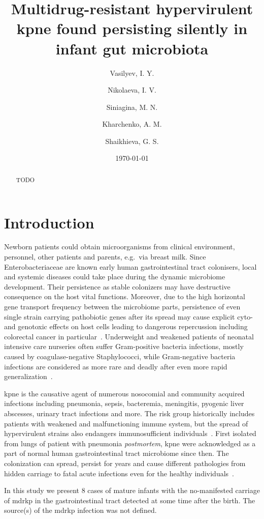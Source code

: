 \documentclass[12pt,a4paper]{article}
\author[1]{Vasilyev, I. Y.} %
\author[2]{Nikolaeva, I. V.}  %
\author[1]{Siniagina, M. N.}  %
\author[1]{Kharchenko, A. M.}  %
\author[2]{Shaikhieva, G. S.}  %
\affil[1]{Institute of Fundamental Medicine and Biology, Kazan Federal University, Kazan, Russia}
\affil[2]{Kazan State Medical University, Kazan, Russia}
\title{Multidrug-resistant hypervirulent \Gls{kpne} found persisting silently in infant gut microbiota}
\date{\today}
\begin{document}
\maketitle
\glsresetall

\begin{abstract}
TODO
\end{abstract}

\section{Introduction}\label{sec:intro}
Newborn patients could obtain microorganisms from clinical environment, personnel, other patients and parents,
e.g.\ via breast milk.
Since Enterobacteriaceae are known early human gastrointestinal tract colonisers, local and systemic diseases could take
place during the dynamic microbiome development.
Their persistence as stable colonizers may have destructive consequence on the host vital functions.
Moreover, due to the high horizontal gene transport frequency between the microbiome parts, persistence of even single
strain carrying pathobiotic genes after its spread may cause explicit cyto- and genotoxic effects on host cells
leading to dangerous repercussion including colorectal cancer in particular~\cite{Pope2019}.
Underweight and weakened patients of neonatal intensive care nurseries often suffer Gram-positive bacteria infections,
mostly caused by coagulase-negative Staphylococci, while Gram-negative bacteria infections are considered as more rare
and deadly after even more rapid generalization~\cite{Dorota2017}.

\gls{kpne} is the causative agent of numerous nosocomial and community acquired infections including
pneumonia, sepsis, bacteremia, meningitis, pyogenic liver abscesses, urinary tract infections and more.
The risk group historically includes patients with weakened and malfunctioning immune system, but the spread of
hypervirulent strains also endangers immunosufficient individuals~\cite{Shankar2018}.
First isolated from lungs of patient with pneumonia \textit{postmortem}, \gls{kpne} were acknowledged as a part of
normal human gastrointestinal tract microbiome since then.
The colonization can spread, persist for years and cause different pathologies from hidden carriage to
fatal acute infections even for the healthy individuals~\cite{Martin2018}.

In this study we present 8 cases of mature infants with the no-manifested carriage of
\gls{mdrkp} in the gastrointestinal tract detected at some time after the birth.
The source(s) of the \gls{mdrkp} infection was not defined.
\end{document}
